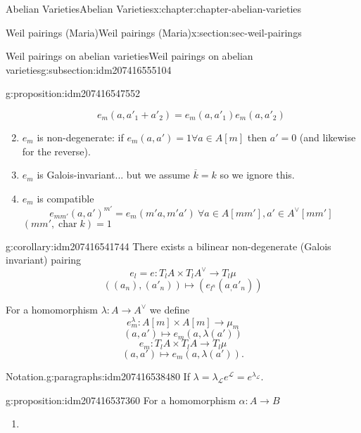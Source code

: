 \documentclass[oneside,10pt,]{book}
\numberwithin{equation}{section}
\newcommand{\sheaf}[1]{\operatorname{\mathcal{#1}}}
\newcommand{\lb}{[}
\newcommand{\rb}{]}
\DeclareMathOperator{\characteristic}{char}
\begin{document}
\begin{chapterptx}{Abelian Varieties}{}{Abelian Varieties}{}{}{x:chapter:chapter-abelian-varieties}
\begin{sectionptx}{Weil pairings (Maria)}{}{Weil pairings (Maria)}{}{}{x:section:sec-weil-pairings}
\begin{subsectionptx}{Weil pairings on abelian varieties}{}{Weil pairings on abelian varieties}{}{}{g:subsection:idm207416555104}
\begin{proposition}{}{}{g:proposition:idm207416547552}
\begin{enumerate}
%
\begin{equation*}
e_m(a,a'_1+a'_2) = e_m(a,a'_1)e_m(a,a'_2)
\end{equation*}
%
\item{}\(e_m\) is non-degenerate: if \(e_m(a,a') = 1 \forall a\in A\lb m\rb\) then \(a' = 0\) (and likewise for the reverse).%
\item{}\(e_m\) is Galois-invariant... but we assume \(\overline k =k\) so we ignore this.%
\item{}\(e_m\) is compatible%
\begin{equation*}
e_{mm'} (a,a')^{m'} = e_m(m'a, m'a') \ \forall a \in A[mm'], a'\in A^\vee [mm']
\end{equation*}
\((mm',\characteristic k) = 1\)%
\end{enumerate}
%
\end{proposition}
\begin{corollary}{}{}{g:corollary:idm207416541744}%
There exists a bilinear non-degenerate (Galois invariant) pairing%
\begin{equation*}
e_l = e \colon T_lA \times T_lA^\vee \to T_l\mu
\end{equation*}
%
\begin{equation*}
((a_n), (a'_n)) \mapsto (e_{l^n}(a_,a'_n))
\end{equation*}
%
\end{corollary}
For a homomorphism \(\lambda \colon A \to A^\vee\) we define%
\begin{equation*}
e_m^\lambda \colon A[m]\times A [m] \to \mu_m
\end{equation*}
%
\begin{equation*}
(a,a') \mapsto e_m(a, \lambda(a'))
\end{equation*}
%
\begin{equation*}
e_m \colon T_lA\times T_l A \to T_l \mu
\end{equation*}
%
\begin{equation*}
(a,a') \mapsto e_m(a, \lambda(a'))\text{.}
\end{equation*}
%
\begin{paragraphs}{Notation.}{g:paragraphs:idm207416538480}%
If \(\lambda = \lambda_{\sheaf L} e^{\sheaf L} = e^{\lambda_{\sheaf L}}\).%
\end{paragraphs}%
\begin{proposition}{}{}{g:proposition:idm207416537360}%
For a homomorphism \(\alpha \colon A \to B\)%
\begin{enumerate}
\item{}%
\begin{equation*}

\end{equation*}
\end{enumerate}
\end{proposition}
\end{subsectionptx}
\end{sectionptx}
\end{chapterptx}
\end{document}
